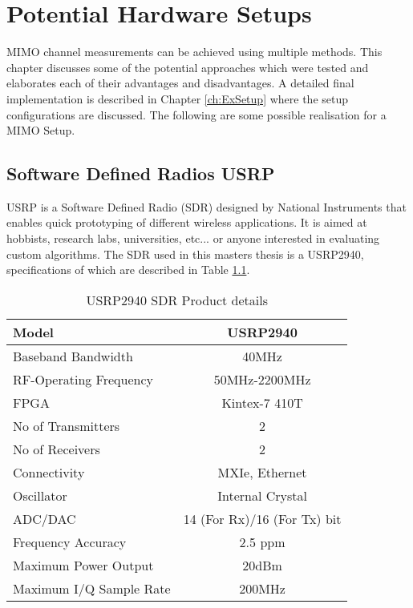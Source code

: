 \chapter{Potential Hardware Setups}
\label{ch:PotenHWSetup}

MIMO channel measurements can be achieved using multiple methods. This chapter discusses some of the potential approaches which were tested and elaborates each of their advantages and disadvantages. A detailed final implementation is described in Chapter \ref{ch:ExSetup} where the setup configurations are discussed. The following are some possible realisation for a MIMO Setup.

\section{Software Defined Radios USRP}\label{sec:USRP}

USRP is a Software Defined Radio (SDR) designed by National Instruments that enables quick prototyping of different wireless applications. It is aimed at hobbists, research labs, universities, etc... or anyone interested in evaluating custom algorithms. The SDR used in this masters thesis is a USRP2940, specifications of which are described in Table \ref{tb:USRP}.

\begin{table}[H]
    \begin{center}
        \begin{tabular}{|l|c|}
        \hline
            Model                   & USRP2940          \\ \hline
            Baseband Bandwidth      & 40MHz             \\ \hline
            RF-Operating Frequency  & 50MHz-2200MHz     \\ \hline
            FPGA                    & Kintex-7 410T     \\ \hline
            No of Transmitters      & 2                 \\ \hline
            No of Receivers         & 2                 \\ \hline
            Connectivity            & MXIe, Ethernet    \\ \hline
            Oscillator              & Internal Crystal  \\ \hline
            ADC/DAC                 & 14 (For Rx)/16 (For Tx) bit         \\ \hline
            Frequency Accuracy      & 2.5 ppm           \\ \hline
            Maximum Power Output    & 20dBm             \\ \hline
            Maximum I/Q Sample Rate & 200MHz            \\ \hline
        \end{tabular}
    \end{center}
    \caption{USRP2940 SDR Product details}
    \label{tb:USRP}
\end{table}

